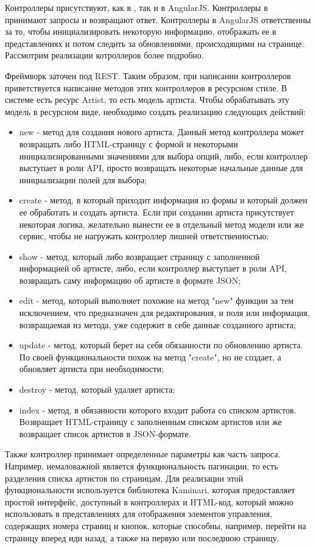 Контроллеры присутствуют, как в \ror{}, так и в AngularJS. Контроллеры в \ror{} принимают запросы и возвращают ответ. Контроллеры в AngularJS ответственны за то, чтобы инициализировать некоторую информацию, отображать ее в представлениях и потом следить за обновлениями, происходящими на странице. Рассмотрим реализации котроллеров более подробно.

Фреймворк \ror{} заточен под REST. Таким образом, при написании контроллеров приветствуется написание методов этих контроллеров в ресурсном стиле. В системе есть ресурс Artist, то есть модель артиста. Чтобы обрабатывать эту модель в ресурсном виде, необходимо создать реализацию следующих действий:

\begin{itemize}
  \item new - метод для создания нового артиста. Данный метод контроллера может возвращать либо HTML-страницу с формой и некоторыми инициализированными значениями для выбора опций, либо, если контроллер выступает в роли API, просто возвращать некоторые начальные данные для инициализации полей для выбора;
  \item create - метод, в который приходит информация из формы и который должен ее обработать и создать артиста. Если при создании артиста присутствует некоторая логика, желательно вынести ее в отдельный метод модели или же сервис, чтобы не нагружать контроллер лишней ответственностью;
  \item show - метод, который либо возвращает страницу с заполненной информацией об артисте, либо, если контроллер выступает в роли API, возвращать саму информацию об артисте в формате JSON;
  \item edit - метод, который выполняет похожие на метод "new" функции за тем исключением, что предназначен для редактирования, и поля или информация, возвращаемая из метода, уже содержит в себе данные созданного артиста;
  \item update - метод, который берет на себя обязанности по обновлению артиста. По своей функциональности похож на метод "create", но не создает, а обновляет артиста при необходимости;
  \item destroy - метод, который удаляет артиста;
  \item index - метод, в обязанности которого входит работа со списком артистов. Возвращает HTML-страницу с заполненным списком артистов или же возвращает список артистов в JSON-формате.
\end{itemize}

Также контроллер принимает определенные параметры как часть запроса. Например, немаловажной является функциональность пагинации, то есть разделения списка артистов по страницам. Для реализации этой функциональности используется библиотека Kaminari, которая предоставляет простой интерфейс, доступный в контроллерах и HTML-код, который можно использовать в представлениях для отображения элементов управления, содержащих номера страниц и кнопок, которые способны, например, перейти на страницу вперед иди назад, а также на первую или последнюю страницу.

